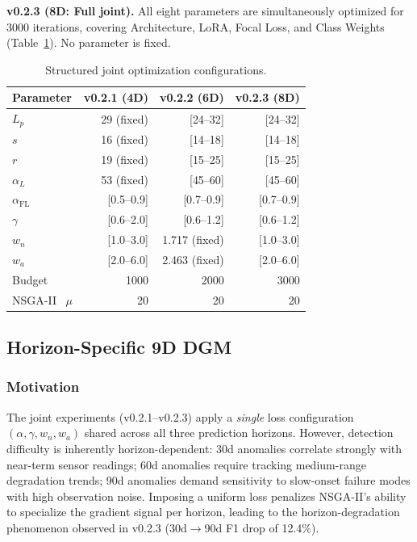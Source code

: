 ﻿\documentclass[twocolumn]{article}
\begin{document}
\textbf{v0.2.3 (8D: Full joint).}
All eight parameters are simultaneously optimized for 3000 iterations,
covering Architecture, LoRA, Focal Loss, and Class Weights
(Table~\ref{tab:joint_config}).
No parameter is fixed.

\begin{table}
\centering
\caption{Structured joint optimization configurations.}
\label{tab:joint_config}
\small
\renewcommand{\arraystretch}{1.05}
\setlength{\tabcolsep}{2.5pt}
\begin{tabular}{lrrr}
\toprule
\textbf{Parameter} & \textbf{v0.2.1 (4D)} & \textbf{v0.2.2 (6D)} & \textbf{v0.2.3 (8D)} \\
\midrule
$L_p$ & 29 (fixed) & {[}24--32{]} & {[}24--32{]} \\
$s$ & 16 (fixed) & {[}14--18{]} & {[}14--18{]} \\
$r$ & 19 (fixed) & {[}15--25{]} & {[}15--25{]} \\
$\alpha_L$ & 53 (fixed) & {[}45--60{]} & {[}45--60{]} \\
$\alpha_{\text{FL}}$ & {[}0.5--0.9{]} & {[}0.7--0.9{]} & {[}0.7--0.9{]} \\
$\gamma$ & {[}0.6--2.0{]} & {[}0.6--1.2{]} & {[}0.6--1.2{]} \\
$w_n$ & {[}1.0--3.0{]} & 1.717 (fixed) & {[}1.0--3.0{]} \\
$w_a$ & {[}2.0--6.0{]} & 2.463 (fixed) & {[}2.0--6.0{]} \\
\midrule
Budget & 1000 & 2000 & 3000 \\
NSGA-II ~$\mu$ & 20 & 20 & 20 \\
\bottomrule
\end{tabular}
\end{table}

\subsection{Horizon-Specific 9D DGM}
\label{subsec:v021H}

\subsubsection{Motivation}

The joint experiments (v0.2.1--v0.2.3) apply a \emph{single}
loss configuration $(\alpha,\gamma,w_n,w_a)$ shared across all three
prediction horizons.
However, detection difficulty is inherently horizon-dependent:
30d anomalies correlate strongly with near-term sensor readings;
60d anomalies require tracking medium-range degradation trends;
90d anomalies demand sensitivity to slow-onset failure modes with
high observation noise.
Imposing a uniform loss penalizes NSGA-II's ability to specialize
the gradient signal per horizon, leading to the horizon-degradation
phenomenon observed in v0.2.3 (30d$\to$90d F1 drop of 12.4\%).
\end{document}
